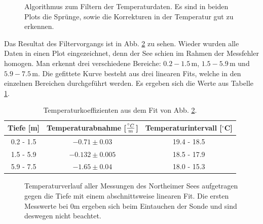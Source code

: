 \documentclass[12pt,a4paper,titlepage,headinclude,bibtotoc]{scrartcl}
\numberwithin{equation}{subsection}
\begin{document}
\begin{figure}[!h]
	\centering
   \hfill
	\caption{Algorithmus zum Filtern der Temperaturdaten. Es sind in beiden Plots die Sprünge, sowie die Korrekturen in der Temperatur gut zu erkennen.}
	\label{fig:tempAlg}
\end{figure}

Das Resultat des Filtervorgangs ist in Abb. \ref{fig:temp_nor} zu sehen.
Wieder wurden alle Daten in einen Plot eingezeichnet, denn der See schien  im Rahmen der Messfehler homogen.
Man erkennt drei verschiedene Bereiche: $0.2-1.5\,$m, $1.5-5.9\,$m und $5.9-7.5\,$m.
Die gefittete Kurve besteht aus drei linearen Fits, welche in den einzelnen Bereichen durchgeführt werden.
Es ergeben sich die Werte aus Tabelle \ref{tab:tempTabNor}.

\begin{table}[!htb]
\centering
\begin{tabular}{|c||c|c|}
\hline
Tiefe [m] & Temperaturabnahme [$\frac{^\circ C}{\text m}$] & Temperaturintervall [$^\circ$C]\\\hline\hline
0.2 - 1.5 & $-0.71\pm  0.03$	& 19.4 - 18.5 \\
1.5 - 5.9 & $-0.132\pm 0.005$	& 18.5 - 17.9 \\
5.9 - 7.5 & $-1.65\pm 0.04$	& 18.0 - 15.3 \\\hline
\end{tabular}
\caption{Temperaturkoeffizienten aus dem Fit von Abb. \ref{fig:temp_nor}.}
\label{tab:tempTabNor}
\end{table}


\begin{figure}[!h]
\centering

\caption{Temperaturverlauf aller Messungen des Northeimer Sees aufgetragen gegen die Tiefe mit einem abschnittsweise linearen Fit. Die ersten Messwerte bei 0\si{\meter} ergeben sich beim Eintauchen der Sonde und sind deswegen nicht beachtet.}
\label{fig:temp_nor}
\end{figure}
\end{document}
